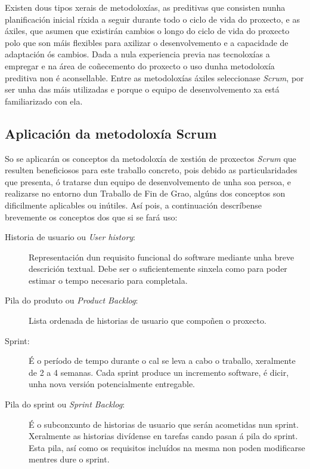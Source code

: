 Existen dous tipos xerais de metodoloxías, as preditivas que consisten nunha planificación inicial ríxida a seguir durante todo o ciclo de vida do proxecto, e as áxiles, que asumen que existirán cambios o longo do ciclo de vida do proxecto polo que son máis flexibles para axilizar o desenvolvemento e a capacidade de adaptación ós cambios. Dada a nula experiencia previa nas tecnoloxías a empregar e  na área de coñecemento do proxecto o uso dunha metodoloxía preditiva non é aconsellable. Entre as metodoloxías áxiles seleccionase \emph{Scrum}\cite{ScrumManager}, por ser unha das máis utilizadas e porque o equipo de desenvolvemento xa está familiarizado con ela.

\subsection{Aplicación da metodoloxía Scrum}

So se aplicarán os conceptos da metodoloxía de xestión de proxectos \emph{Scrum} que resulten beneficiosos para este traballo concreto, pois debido as particularidades que presenta, ó tratarse dun equipo de desenvolvemento de unha soa persoa, e realizarse no entorno dun Traballo de Fin de Grao, algúns dos conceptos son dificilmente aplicables ou inútiles. Así pois, a continuación descríbense brevemente os conceptos dos que si se fará uso:
\begin{description}
\item[Historia de usuario ou \emph{User history}:] Representación dun requisito funcional do software mediante unha breve descrición textual. Debe ser o suficientemente sinxela como para poder estimar o tempo necesario para completala.
\item[Pila do produto ou \emph{Product Backlog}:] Lista ordenada de historias de usuario que compoñen o proxecto.
\item[Sprint:] É o período de tempo durante o cal se leva a cabo o traballo, xeralmente de 2 a 4 semanas. Cada sprint produce un incremento software, é dicir, unha nova versión potencialmente entregable.
\item[Pila do sprint ou \emph{Sprint Backlog}:] É o subconxunto de historias de usuario que serán acometidas nun sprint. Xeralmente as historias divídense en tarefas cando pasan á pila do sprint. Esta pila, así como os requisitos incluídos na mesma non poden modificarse mentres dure o sprint.
\end{description}

